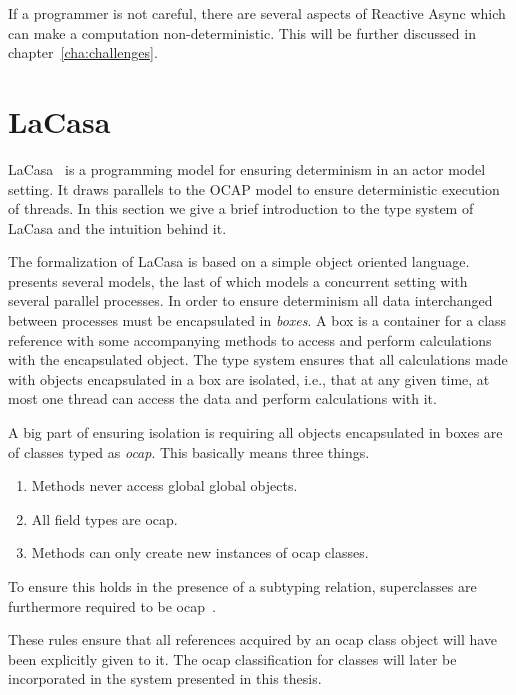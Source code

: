 If a programmer is not careful, there are several aspects of Reactive Async
which can make a computation non-deterministic. This will be further discussed
in chapter~\ref{cha:challenges}. 



\section{LaCasa}\label{sec:lacasa}

LaCasa~\parencite{conf/oopsla/HallerL16} is a programming model for ensuring
determinism in an actor model~\parencite{Hewi73a} setting. It draws
parallels to the OCAP model to ensure deterministic execution of threads. In
this section we give a brief introduction to the type system of LaCasa and the
intuition behind it.

The formalization of LaCasa is based on a simple object oriented language.
\textcite{conf/oopsla/HallerL16} presents several models, the last of which
models a concurrent setting with several parallel processes. In order to ensure
determinism all data interchanged between processes must be encapsulated in
\emph{boxes}. A box is a container for a class reference with some accompanying
methods to access and perform calculations with the encapsulated object. The
type system ensures that all calculations made with objects encapsulated in a box
are isolated, i.e., that at any given time, at most one thread can access the
data and perform calculations with it.

A big part of ensuring isolation is requiring all objects encapsulated in boxes
are of classes typed as \emph{ocap}. This basically means three things.
\begin{enumerate}
  \item Methods never access global global objects.
  \item All field types are ocap.
  \item Methods can only create new instances of ocap classes.
\end{enumerate}
To ensure this holds in the presence of a subtyping relation, superclasses are
furthermore required to be ocap~\parencite{conf/oopsla/HallerL16}.

These rules ensure that all references acquired by an ocap class object will have been
explicitly given to it. The ocap classification for classes will later be
incorporated in the system presented in this thesis.

